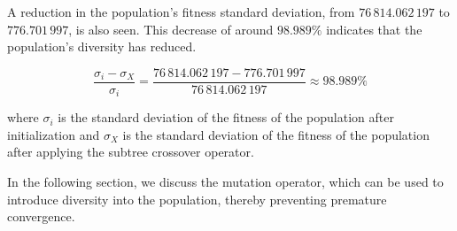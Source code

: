  A reduction in the population's fitness standard deviation, from 
  \(76\,814.062\,197\) to \(776.701\,997\), is also seen.
  This decrease of around \(98.989\%\) indicates that the population's diversity
  has reduced.

  \[
    \frac{\sigma_i - \sigma_X}{\sigma_i}
     = \frac{76\,814.062\,197 - 776.701\,997}{76\,814.062\,197} \approx 98.989\%
  \]

  where \(\sigma_i\) is the standard deviation of the fitness of the population
  after initialization and \(\sigma_X\) is the standard deviation of the
  fitness of the population after applying the subtree crossover operator.

  In the following section, we discuss the mutation operator, which can be used 
  to introduce diversity into the population, thereby preventing premature 
  convergence.
